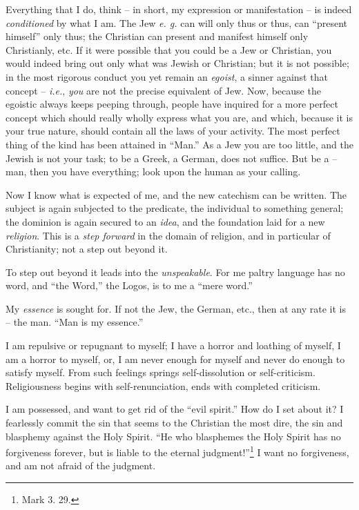 \documentclass[12pt,a4paper]{book}
\begin{document}
Everything that I do, think -- in short, my expression or manifestation -- is 
indeed \textit{conditioned} by what I am. The Jew \textit{e. g.} can will only 
thus or thus, can ``present himself'' only thus; the Christian can present 
and manifest himself only Christianly, etc. If it were possible that you could 
be a Jew or Christian, you would indeed bring out only what was Jewish or 
Christian; but it is not possible; in the most rigorous conduct you yet remain 
an \textit{egoist}, a sinner against that concept -- \textit{i.e.}, 
\textit{you} are not the precise equivalent of Jew. Now, because the egoistic 
always keeps peeping through, people have inquired for a more perfect concept 
which should really wholly express what you are, and which, because it is your 
true nature, should contain all the laws of your activity. The most perfect 
thing of the kind has been attained in ``Man.'' As a Jew you are too little, 
and the Jewish is not your task; to be a Greek, a German, does not suffice. 
But be a -- man, then you have everything; look upon the human as your 
calling.

Now I know what is expected of me, and the new catechism can be written. The 
subject is again subjected to the predicate, the individual to something 
general; the dominion is again secured to an \textit{idea}, and the foundation 
laid for a new \textit{religion}. This is a \textit{step forward} in the 
domain of religion, and in particular of Christianity; not a step out beyond 
it.

To step out beyond it leads into the \textit{unspeakable}. For me paltry 
language has no word, and ``the Word,'' the Logos, is to me a ``mere 
word.''

My \textit{essence} is sought for. If not the Jew, the German, etc., then at 
any rate it is -- the man. ``Man is my essence.''

I am repulsive or repugnant to myself; I have a horror and loathing of myself, 
I am a horror to myself, or, I am never enough for myself and never do enough 
to satisfy myself. From such feelings springs self-dissolution or 
self-criticism. Religiousness begins with self-renunciation, ends with 
completed criticism.

I am possessed, and want to get rid of the ``evil spirit.'' How do I set 
about it? I fearlessly commit the sin that seems to the Christian the most 
dire, the sin and blasphemy against the Holy Spirit. ``He who blasphemes the 
Holy Spirit has no forgiveness forever, but is liable to the eternal 
judgment!''\footnote{Mark 3. 29.} I want no forgiveness, and am not afraid of 
the judgment.
\end{document}
